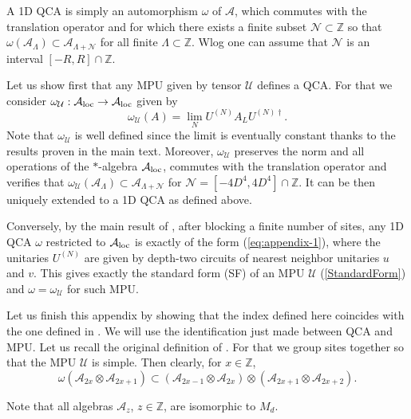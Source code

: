 \documentclass[pra,twocolumn,nofootinbib,superscriptaddress]{revtex4-1}
\begin{document}
A 1D QCA is simply an automorphism $\omega$ of ${\mathcal{A}}$, which commutes with the translation operator and for which there exists a finite subset $\mathcal{N}\subset \mathbb Z$ so that $\omega(\mathcal{A}_{\Lambda})\subset \mathcal{A}_{\Lambda +\mathcal{N}}$ for all finite $\Lambda\subset \mathbb Z$. Wlog one can assume that $\mathcal{N}$ is an interval $[-R,R]\cap\mathbb Z$.

Let us show first that any MPU given by tensor $\mathcal{U}$ defines a QCA. For that we consider
$\omega_{\mathcal U}: \mathcal{A}_{\rm loc}\rightarrow \mathcal{A}_{\rm loc}$
given by
\begin{equation}\label{eq:appendix-1}
	\omega_{\mathcal U} (A)=\lim_N U^{(N)}A_L U^{(N)\dagger}.
\end{equation}
Note that $\omega_{\mathcal U}$ is well defined since the limit is eventually constant thanks to the results proven in the main text. Moreover,  $\omega_{\mathcal U}$ preserves the norm and all operations of the $*$-algebra $\mathcal{A}_{\rm loc}$, commutes with the translation operator and verifies that $\omega_{\mathcal U}(\mathcal{A}_{\Lambda})\subset \mathcal{A}_{\Lambda +\mathcal{N}}$ for $\mathcal N = [-4D^4,4D^4]\cap \mathbb Z$. It can be then uniquely extended to a 1D QCA as defined above.

Conversely, by the main result of \cite{schumacher:qca}, after blocking a finite number of sites, any 1D QCA  $\omega$ restricted to $\mathcal{A}_{\rm loc}$ is exactly of the form (\ref{eq:appendix-1}), where the unitaries $U^{(N)}$ are given by  depth-two circuits of nearest neighbor unitaries $u$ and $v$. This gives exactly the standard form (SF) of an MPU $\mathcal{U}$ (\ref{StandardForm}) and $\omega=\omega_{\mathcal{U}}$ for such MPU.

Let us finish this appendix by showing that the index defined here
coincides with the one defined in \cite{gross:index-theorem}. We will use
the identification just made between QCA and MPU. Let us recall the
original definition of \cite{gross:index-theorem}. For that we group sites
together so that the MPU $\mathcal{U}$ is simple. Then clearly, for $x\in
	\mathbb Z$,
$$\omega(\mathcal{A}_{2x}\otimes \mathcal{A}_{2x+1})\subset
	\left( \mathcal{A}_{2x-1}\otimes \mathcal{A}_{2x}\right)\otimes
	\left(\mathcal{A}_{2x+1}\otimes \mathcal{A}_{2x+2}\right).$$

Note that all algebras $\mathcal{A}_{z}$, $z\in \mathbb Z$, are isomorphic to $M_d$.
\end{document}
